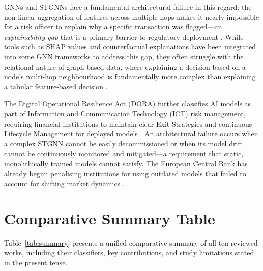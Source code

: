 \documentclass[12pt, a4paper]{article}
\begin{document}
GNNs and STGNNs face a fundamental architectural failure in this regard: the non-linear aggregation of features across multiple hops makes it nearly impossible for a risk officer to explain why a specific transaction was flagged---an \textit{explainability gap} that is a primary barrier to regulatory deployment \cite{kazim2025drift}. While tools such as SHAP values and counterfactual explanations have been integrated into some GNN frameworks to address this gap, they often struggle with the relational nature of graph-based data, where explaining a decision based on a node's multi-hop neighbourhood is fundamentally more complex than explaining a tabular feature-based decision \cite{ieeeaccess2025drift}.

The Digital Operational Resilience Act (DORA) further classifies AI models as part of Information and Communication Technology (ICT) risk management, requiring financial institutions to maintain clear Exit Strategies and continuous Lifecycle Management for deployed models \cite{dora2025}. An architectural failure occurs when a complex STGNN cannot be easily decommissioned or when its model drift cannot be continuously monitored and mitigated---a requirement that static, monolithically trained models cannot satisfy. The European Central Bank has already begun penalising institutions for using outdated models that failed to account for shifting market dynamics \cite{kazim2025drift}.

\section{Comparative Summary Table}

Table~\ref{tab:summary} presents a unified comparative summary of all ten reviewed works, including their classifiers, key contributions, and study limitations stated in the present tense.
\end{document}
